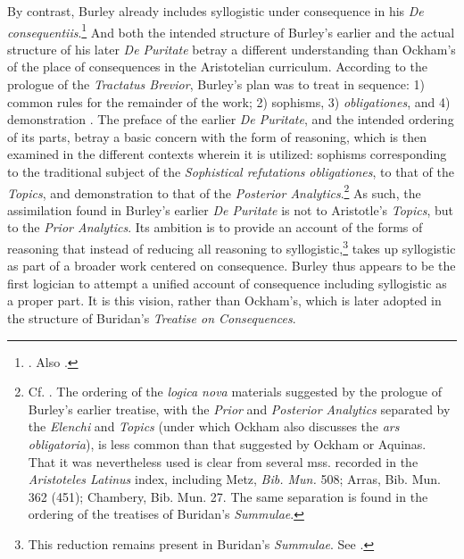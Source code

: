 \documentclass[]{birkjour}
\begin{document}
By contrast, Burley already includes syllogistic under consequence in his \textit{De consequentiis}.\footnote{\autocite[pp. 131-132, par. 82-85]{Green-Pedersen1980b}. Also \autocite[p. 219.19-32]{BurleyDPAL}.} And both the intended structure of Burley's earlier and the actual structure of his later \textit{De Puritate} betray a different understanding than Ockham's of the place of consequences in the Aristotelian curriculum.
According to the prologue of the \textit{Tractatus Brevior}, Burley's plan was to treat in sequence: 1) common rules for the remainder of the work; 2) sophisms, 3) \textit{obligationes}, and 4) demonstration \autocite[p. 199]{BurleyDPAL}. The preface of the earlier \textit{De Puritate}, and the intended ordering of its parts, betray a basic concern with the form of reasoning, which is then examined in the different contexts wherein it is utilized: sophisms corresponding to the traditional subject of the \textit{Sophistical refutations} \textit{obligationes}, to that of the \textit{Topics}, and demonstration to that of the \textit{Posterior Analytics}.\footnote{Cf. \autocite[prol.]{AquinasPA}. The ordering of the \textit{logica nova} materials suggested by the prologue of Burley's earlier treatise, with the \textit{Prior} and \textit{Posterior Analytics} separated by the \textit{Elenchi} and \textit{Topics} (under which Ockham also discusses the \textit{ars obligatoria}), is less common than that suggested by Ockham or Aquinas. That it was nevertheless used is clear from several mss. recorded in the \textit{Aristoteles Latinus} index, including Metz, \textit{Bib. Mun.} 508; Arras, Bib. Mun. 362 (451); Chambery, Bib. Mun. 27. The same separation is found in the ordering of the treatises of Buridan's \textit{Summulae}.} As such, the assimilation found in Burley's earlier \textit{De Puritate} is not to Aristotle's \textit{Topics}, but to the \textit{Prior Analytics}. Its ambition is to provide an account of the forms of reasoning that instead of reducing all reasoning to syllogistic,\footnote{This reduction remains present in Buridan's \textit{Summulae}. See \autocite[6.1.5, pp. 398-400]{BuridanKlimaSD}.} takes up syllogistic as part of a broader work centered on consequence. Burley thus appears to be the first logician to attempt a unified account of consequence including syllogistic as a proper part. It is this vision, rather than Ockham's, which is later adopted in the structure of Buridan's \textit{Treatise on Consequences}.
	
	
\end{document}
